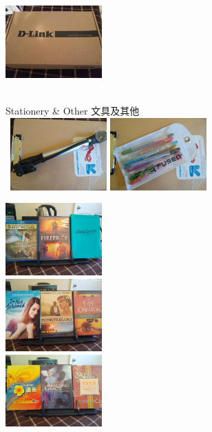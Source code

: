 \documentclass{article}[12pt]
\begin{document}
{\begin{minipage}[t][\textheight-27pt][t]{445pt}
\begin{minipage}[b]{110pt}
\includegraphics[width=105pt]{verizon_modem02_mini.jpg} 	
\end{minipage} \\[5pt]
%
Stationery \& Other 文具及其他 \dotfill \\[5pt]
\mbox{ }\hspace{2pt}\includegraphics[width=105pt]{portable_air_bump_mini.jpg}
\includegraphics[width=105pt]{color_pens_mini.jpg}
\begin{minipage}[b]{110pt}
\includegraphics[width=105pt]{dvd05_mini.jpg} \\
\includegraphics[width=105pt]{dvd02_mini.jpg} \\
\includegraphics[width=105pt]{dvd03_mini.jpg}

\end{minipage}
\end{minipage}}
\end{document}
